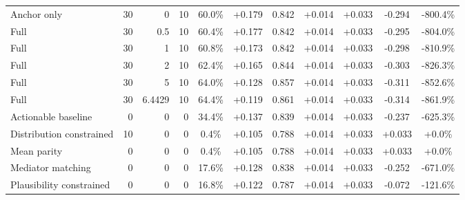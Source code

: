 \begin{table}[htbp]
\begin{tabular}{lrrrccccccc}
Anchor only & 30 & 0 & 10 & 60.0\% & +0.179 & 0.842 & +0.014 & +0.033 & -0.294 & -800.4\% \\
Full & 30 & 0.5 & 10 & 60.4\% & +0.177 & 0.842 & +0.014 & +0.033 & -0.295 & -804.0\% \\
Full & 30 & 1 & 10 & 60.8\% & +0.173 & 0.842 & +0.014 & +0.033 & -0.298 & -810.9\% \\
Full & 30 & 2 & 10 & 62.4\% & +0.165 & 0.844 & +0.014 & +0.033 & -0.303 & -826.3\% \\
Full & 30 & 5 & 10 & 64.0\% & +0.128 & 0.857 & +0.014 & +0.033 & -0.311 & -852.6\% \\
Full & 30 & 6.4429 & 10 & 64.4\% & +0.119 & 0.861 & +0.014 & +0.033 & -0.314 & -861.9\% \\
Actionable baseline & 0 & 0 & 0 & 34.4\% & +0.137 & 0.839 & +0.014 & +0.033 & -0.237 & -625.3\% \\
Distribution constrained & 10 & 0 & 0 & 0.4\% & +0.105 & 0.788 & +0.014 & +0.033 & +0.033 & +0.0\% \\
Mean parity & 0 & 0 & 0 & 0.4\% & +0.105 & 0.788 & +0.014 & +0.033 & +0.033 & +0.0\% \\
Mediator matching & 0 & 0 & 0 & 17.6\% & +0.128 & 0.838 & +0.014 & +0.033 & -0.252 & -671.0\% \\
Plausibility constrained & 0 & 0 & 0 & 16.8\% & +0.122 & 0.787 & +0.014 & +0.033 & -0.072 & -121.6\% \\
\bottomrule
\end{tabular}
\end{table}